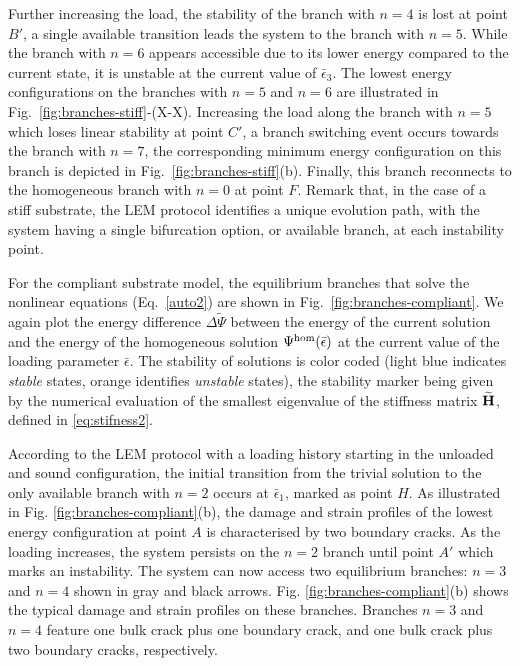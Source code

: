 Further increasing the load, the stability of the branch with $n=4$ is lost at point $B'$, a single available transition leads the system to the branch with $n=5$. While the branch with $n=6$ appears accessible due to its lower energy compared to the current state, it is unstable at the current value of $\bar\epsilon_3$. The lowest energy configurations on the branches with $n=5$ and $n=6$ are illustrated in Fig.~\ref{fig:branches-stiff}-(X-X). Increasing the load along the branch with $n=5$ which loses linear stability at point $C'$, a branch switching event occurs towards the branch with $n=7$, the corresponding minimum energy configuration on this branch is depicted in Fig.~\ref{fig:branches-stiff}(b). Finally, this branch reconnects to the homogeneous branch with $n=0$ at point $F$. Remark that, in the case of a stiff substrate, the LEM protocol identifies a unique evolution path, with the system having a single bifurcation option, or available branch, at each instability point.

For the compliant substrate model, the equilibrium branches that solve the nonlinear equations (Eq.~\ref{auto2}) are shown in Fig.~\ref{fig:branches-compliant}. 
We again plot the energy difference $\Delta \widetilde\Psi$ between the energy of the current solution and the energy of the homogeneous solution $\Psi^\text{hom} (\bar{\epsilon})$ at the current value of the loading parameter $\bar\epsilon$. 
The stability of solutions is color coded (light blue indicates \emph{stable} states, orange identifies \emph{unstable} states), the stability marker being given by the numerical evaluation of the smallest eigenvalue of the stiffness matrix $\widetilde{\mathbf{H}}$, defined in \eqref{eq:stifness2}.

According to the LEM protocol with a loading history starting in the unloaded and sound configuration, the initial transition from the trivial solution to the only available branch with $n=2$ occurs at $\bar \epsilon_1$, marked as point $H$. As illustrated in Fig. \ref{fig:branches-compliant}(b), the damage and strain profiles of the lowest energy configuration at point $A$ is characterised by two boundary cracks. As the loading increases, the system persists on the $n=2$ branch until point $A'$ which marks an instability. The system can now access two equilibrium branches: $n=3$ and $n=4$ shown in gray and black arrows. Fig. \ref{fig:branches-compliant}(b) shows the typical damage and strain profiles on these branches. Branches $n=3$ and $n=4$ feature one bulk crack plus one boundary crack, and one bulk crack plus two boundary cracks, respectively. 

